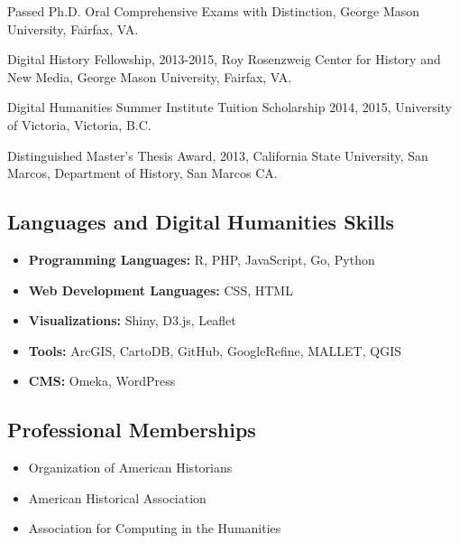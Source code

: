 \documentclass[11pt]{article}
\begin{document}
Passed Ph.D. Oral Comprehensive Exams with Distinction, George Mason University, Fairfax, VA.

Digital History Fellowship, 2013-2015, Roy Rosenzweig Center for History and New Media, George Mason University, Fairfax, VA.

Digital Humanities Summer Institute Tuition Scholarship 2014, 2015, University of Victoria, Victoria, B.C.

Distinguished Master's Thesis Award, 2013, California State University, San Marcos, Department of History, San Marcos CA.

\subsection{Languages and Digital Humanities Skills}
\begin{itemize}
  \itemsep0em 
  \item\textbf{Programming Languages:} R, PHP, JavaScript, Go, Python
  \item\textbf{Web Development Languages:} CSS, HTML
  \item\textbf{Visualizations:} Shiny, D3.js, Leaflet
  \item\textbf{Tools:} ArcGIS, CartoDB, GitHub, GoogleRefine, MALLET, QGIS
  \item\textbf{CMS:} Omeka, WordPress
\end{itemize}

\subsection{Professional Memberships}
\begin{itemize}
  \itemsep0em 
  \item{Organization of American Historians}
  \item{American Historical Association}
  \item{Association for Computing in the Humanities}
\end{itemize}
\end{document}
